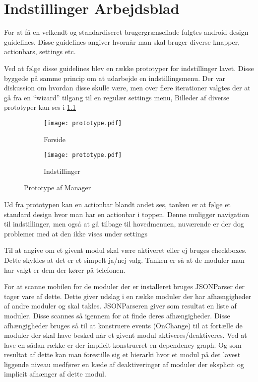 \chapter{Indstillinger Arbejdsblad}
For at få en velkendt og standardiseret brugergrænseflade fulgtes android design guidelines.
Disse guidelines angiver hvornår man skal bruger diverse knapper, actionbars, settings etc.
\cite{androiddesign}

Ved at følge disse guidelines blev en række prototyper for indstillinger lavet.
Disse byggede på samme princip om at udarbejde en indstillingsmenu.
Der var diskussion om hvordan disse skulle være, men over flere iterationer valgtes der at gå fra en ``wizard'' tilgang til en regulær settings menu,
Billeder af diverse prototyper kan ses i \cref{fig:prototype-manager}

\begin{figure}
	\centering
	\begin{subfigure}[b]{0.45\textwidth}
			\texttt{[image: prototype.pdf]}
			\caption{Forside}
	\end{subfigure}
	\begin{subfigure}[b]{0.45\textwidth}
			\texttt{[image: prototype.pdf]}
			\caption{Indstillinger}
	\end{subfigure}
	\caption{Prototype af Manager}
	\label{fig:prototype-manager}
\end{figure}


Ud fra prototypen kan en actionbar blandt andet ses, tanken er at følge et standard design hvor man har en actionbar i toppen.
Denne muliggør navigation til indstillinger, men også at gå tilbage til hovedmenuen, nuværende er der dog problemer med at den ikke vises under settings

Til at angive om et givent modul skal være aktiveret eller ej bruges checkboxes.
Dette skyldes at det er et simpelt ja/nej valg. 
Tanken er så at de moduler man har valgt er dem der kører på telefonen.

For at scanne mobilen for de moduler der er installeret bruges JSONParser der tager vare af dette. 
Dette giver udslag i en række moduler der har afhængigheder af andre moduler og skal takles.
JSONParseren giver som resultat en liste af moduler. Disse scannes så igennem for at finde deres afhængigheder.
Disse afhængigheder bruges så til at konstruere events (OnChange) til at fortælle de moduler der skal have besked når et givent modul aktiveres/deaktiveres.
Ved at lave en sådan række er der implicit konstrueret en dependency graph.
Og som resultat af dette kan man forestille sig et hierarki hvor et modul på det lavest liggende niveau medfører en kæde af deaktiveringer af moduler der eksplicit og implicit afhænger af dette modul.

